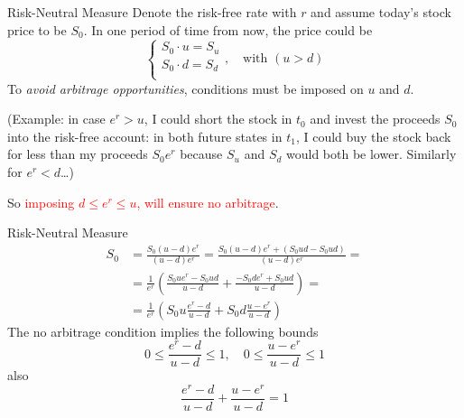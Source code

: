 \documentclass{beamer}
\begin{document}
\begin{frame}{Risk-Neutral Measure}
Denote the risk-free rate with $r$ and assume today's stock price to be $S_0$. In one period of time from now, the price could be 
\begin{equation*}
	\begin{cases}
		S_0\cdot u = S_u \\
		S_0\cdot d = S_d \\ 
	\end{cases}, \quad \text{with }(u > d)
\end{equation*}
\pause
To \emph{avoid arbitrage opportunities}, conditions must be imposed on $u$ and $d$. 

(Example: in case $e^r > u$, I could short the stock in $t_0$ and invest the proceeds $S_0$ into the risk-free account: in both future states in $t_1$, I could buy the stock back for less than my proceeds $S_0e^r$ because $S_u$ and $S_d$ would both be lower. Similarly for $e^r < d$\ldots)
\pause

So \textcolor{red}{imposing $d\le e^r \le u$, will ensure no arbitrage}.
\end{frame}


\begin{frame}{Risk-Neutral Measure}
\begin{equation*}
	\begin{aligned}
	S_0 &= \frac{S_0(u-d)e^r}{(u-d)e^r} = \frac{S_0(u-d)e^r + (S_0ud - S_0ud)}{(u-d)e^r}=\\
	&= \frac{1}{e^r}\left(\frac{S_0ue^r - S_0ud}{u-d} + \frac{-S_0de^r + S_0ud}{u-d}\right)=\\
	&= \frac{1}{e^r}\left(S_0u\frac{e^r - d}{u-d} + S_0d\frac{u - e^r}{u-d}\right)
	\end{aligned}
\end{equation*}
\pause
The no arbitrage condition implies the following bounds
\begin{equation*}
0\le\frac{e^r -d}{u-d}\le 1,\quad 0\le\frac{u - e^r}{u-d}\le 1
\end{equation*}
\pause
also
\begin{equation*}
 \frac{e^r -d}{u-d} + \frac{u - e^r}{u-d} = 1
\end{equation*}
\end{frame}
\end{document}
